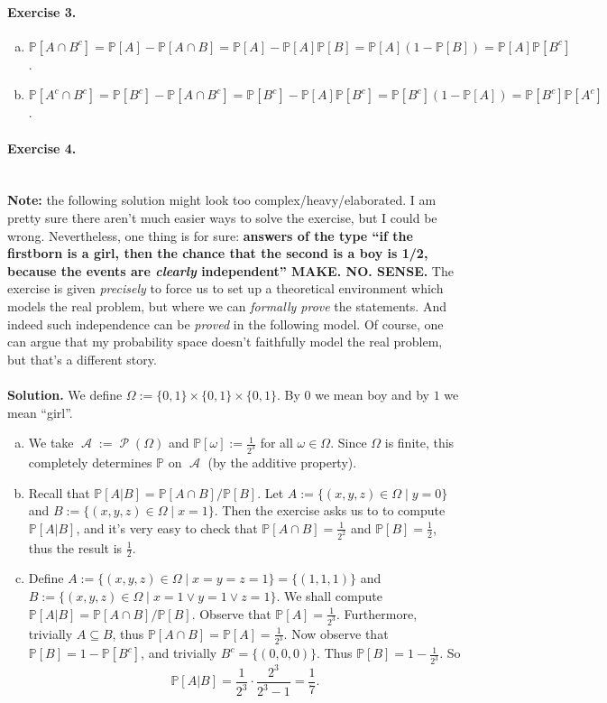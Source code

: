 \documentclass[12pt,a4paper]{report}
\theoremstyle{definition}
\theoremstyle{num.custom-title}
\DeclareMathOperator{\A}{\mathcal{A}}
\DeclareMathOperator{\PP}{\mathcal{P}}
\DeclareMathOperator{\sse}{\subseteq}
\renewcommand{\1}{\mathbbm{1}}
\renewcommand{\P}{\mathbb{P}}
\begin{document}
\paragraph{Exercise 3.} 
\begin{enumerate}[(a)]
\item $\P[A \cap B^c] = \P[A] - \P[A \cap B] = \P[A] - \P[A]\P[B] = \P[A](1-\P[B])=\P[A]\P[B^c]$.
\item $\P[A^c \cap B^c] = \P[B^c] - \P[A \cap B^c] = \P[B^c] - \P[A]\P[B^c] = \P[B^c](1-\P[A]) = \P[B^c]\P[A^c]$.
\end{enumerate}

\paragraph{Exercise 4.}\ \\
\textbf{Note:} the following solution might look too complex/heavy/elaborated. I am pretty sure there aren't much easier ways to solve the exercise, but I could be wrong. Nevertheless, one thing is for sure: \textbf{answers of the type ``if the firstborn is a girl, then the chance that the second is a boy is 1/2, because the events are \emph{clearly} independent'' MAKE. NO. SENSE.} The exercise is given \emph{precisely} to force us to set up a theoretical environment which models the real problem, but where we can \emph{formally prove} the statements. And indeed such independence can be \emph{proved} in the following model. Of course, one can argue that my probability space doesn't faithfully model the real problem, but that's a different story.\\
\\
\noindent\textbf{Solution.} We define $\Omega := \{0,1\} \times \{0,1\} \times \{0,1\}$. By $0$ we mean boy and by $1$ we mean ``girl''.
\begin{enumerate}[(a)]
\item We take $\A := \PP(\Omega)$ and $\P[\omega] := \frac{1}{2^3}$ for all $\omega \in \Omega$. Since $\Omega$ is finite, this completely determines $\P$ on $\A$ (by the additive property).
\item Recall that $\P[A|B] = \P[A \cap B]/\P[B]$. Let $A := \{(x,y,z) \in \Omega \mid y=0\}$ and $B := \{(x,y,z) \in \Omega \mid x=1\}$. Then the exercise asks us to to compute $\P[A|B]$, and it's very easy to check that $\P[A \cap B] = \frac{1}{2^2}$ and $\P[B]=\frac{1}{2}$, thus the result is $\frac{1}{2}$.
\item Define $A := \{(x,y,z) \in \Omega \mid x=y=z=1\} = \{(1,1,1)\}$ and $B := \{(x,y,z) \in \Omega \mid x=1 \vee y=1 \vee z=1\}$. We shall compute $\P[A|B] = \P[A \cap B]/\P[B]$. Observe that $\P[A] = \frac{1}{2^3}$. Furthermore, trivially $A \sse B$, thus $\P[A \cap B] = \P[A] = \frac{1}{2^3}$. Now observe that $\P[B]=1-\P[B^c]$, and trivially $B^c = \{(0,0,0)\}$. Thus $\P[B]=1-\frac{1}{2^3}$. So
\[
\P[A|B] = \frac{1}{2^3} \cdot \frac{2^3}{2^3-1} = \frac{1}{7}.
\]
\end{enumerate}
\end{document}
